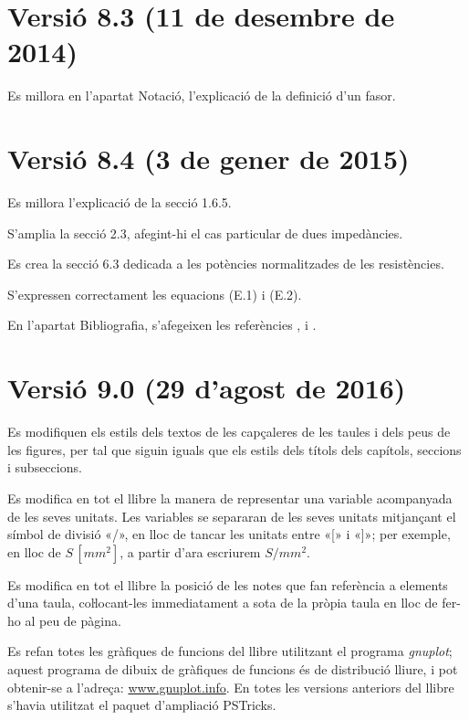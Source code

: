 \section*{Versió 8.3 (11 de desembre de 2014)}

Es millora en l'apartat Notació, l'explicació de la definició d'un fasor.


\section*{Versió 8.4 (3 de gener de 2015)}

Es millora l'explicació de la secció 1.6.5.

S'amplia la secció 2.3, afegint-hi el cas particular de dues impedàncies.

Es crea la secció 6.3 dedicada a les potències normalitzades de les resistències.

S'expressen correctament les equacions (E.1) i (E.2).

En l'apartat Bibliografia, s'afegeixen les referències \cite{AGVS}, \cite{JSch} i \cite{RRop}.


\section*{Versió 9.0 (29 d’agost de 2016)}

Es modifiquen els estils dels textos de les capçaleres de les taules i dels peus de les figures, per tal que siguin iguals que els estils dels títols dels capítols, seccions i subseccions.

Es modifica en tot el llibre la manera de representar una variable acompanyada de les seves unitats. Les variables se separaran de les seves unitats mitjançant el símbol de divisió «/», en lloc de tancar les unitats entre «[» i  «]»; per exemple, en lloc de
$S\si{\,[mm^2]}$, a partir d'ara escriurem $S/\si{mm^2}$.

Es modifica en tot el llibre la posició de les notes que fan referència a elements d'una taula, coŀlocant-les immediatament a sota de la pròpia taula en lloc de fer-ho al peu de pàgina.

Es refan totes les gràfiques de funcions del llibre utilitzant el programa \emph{gnuplot}; aquest programa de dibuix de gràfiques de funcions és de distribució lliure, i pot obtenir-se a l'adreça: \href{http://www.gnuplot.info/}{www.gnuplot.info}. En totes les versions anteriors del llibre s'havia utilitzat el paquet d'ampliació  PSTricks.

